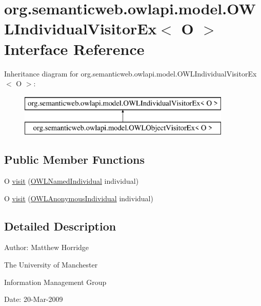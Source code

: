 \hypertarget{interfaceorg_1_1semanticweb_1_1owlapi_1_1model_1_1_o_w_l_individual_visitor_ex_3_01_o_01_4}{\section{org.\-semanticweb.\-owlapi.\-model.\-O\-W\-L\-Individual\-Visitor\-Ex$<$ O $>$ Interface Reference}
\label{interfaceorg_1_1semanticweb_1_1owlapi_1_1model_1_1_o_w_l_individual_visitor_ex_3_01_o_01_4}
}
Inheritance diagram for org.\-semanticweb.\-owlapi.\-model.\-O\-W\-L\-Individual\-Visitor\-Ex$<$ O $>$\-:\begin{figure}[H]
\begin{center}
\leavevmode
\includegraphics[height=2.000000cm]{interfaceorg_1_1semanticweb_1_1owlapi_1_1model_1_1_o_w_l_individual_visitor_ex_3_01_o_01_4}
\end{center}
\end{figure}
\subsection*{Public Member Functions}
\begin{DoxyCompactItemize}
\item 
O \hyperlink{interfaceorg_1_1semanticweb_1_1owlapi_1_1model_1_1_o_w_l_individual_visitor_ex_3_01_o_01_4_adc736f917a9ab96bb0745e59019a0cc9}{visit} (\hyperlink{interfaceorg_1_1semanticweb_1_1owlapi_1_1model_1_1_o_w_l_named_individual}{O\-W\-L\-Named\-Individual} individual)
\item 
O \hyperlink{interfaceorg_1_1semanticweb_1_1owlapi_1_1model_1_1_o_w_l_individual_visitor_ex_3_01_o_01_4_a56f55fdf3f62b313bd04aa7b68f7cb77}{visit} (\hyperlink{interfaceorg_1_1semanticweb_1_1owlapi_1_1model_1_1_o_w_l_anonymous_individual}{O\-W\-L\-Anonymous\-Individual} individual)
\end{DoxyCompactItemize}


\subsection{Detailed Description}
Author\-: Matthew Horridge\par
 The University of Manchester\par
 Information Management Group\par
 Date\-: 20-\/\-Mar-\/2009 

